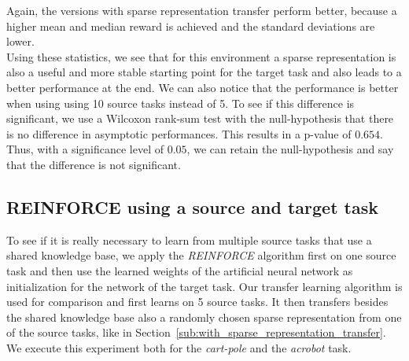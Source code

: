 Again, the versions with sparse representation transfer perform better, because a higher mean and median reward is achieved and the standard deviations are lower.\\
Using these statistics, we see that for this environment a sparse representation is also a useful and more stable starting point for the target task and also leads to a better performance at the end.
We can also notice that the performance is better when using using 10 source tasks instead of 5. To see if this difference is significant, we use a Wilcoxon rank-sum test with the null-hypothesis that there is no difference in asymptotic performances. This results in a p-value of $0.654$. Thus, with a significance level of $0.05$, we can retain the null-hypothesis and say that the difference is not significant.

\subsection{REINFORCE using a source and target task} %
\label{sub:reinforce_using_a_source_and_target_task}
To see if it is really necessary to learn from multiple source tasks that use a shared knowledge base, we apply the \textit{REINFORCE} algorithm first on one source task and then use the learned weights of the artificial neural network as initialization for the network of the target task. Our transfer learning algorithm is used for comparison and first learns on 5 source tasks. It then transfers besides the shared knowledge base also a randomly chosen sparse representation from one of the source tasks, like in Section~\ref{sub:with_sparse_representation_transfer}.\\
We execute this experiment both for the \textit{cart-pole} and the \textit{acrobot} task.

